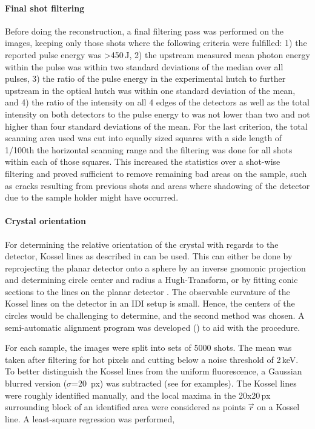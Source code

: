\paragraph{Final shot filtering}
Before doing the reconstruction, a final filtering pass was performed on the images, keeping only those shots where the following criteria were fulfilled: 1)  the reported pulse energy was >450\,\textmu J, 2) the upstream measured mean photon energy within the pulse was within two standard deviations of the median over all pulses, 3) the ratio of the pulse energy in the experimental hutch to further upstream in the optical hutch was within one standard deviation of the mean, and 4) the ratio of the intensity on all 4 edges of the detectors as well as the total intensity on both detectors to the pulse energy to was not lower than two and not higher than four standard deviations of the mean.  For the last criterion, the total scanning area used was cut into equally sized squares with a side length of 1/100th the horizontal scanning range and the filtering was done for all shots within each of those squares. This increased the statistics over a shot-wise filtering and proved sufficient to remove remaining bad areas on the sample, such as cracks resulting from previous shots and areas where shadowing of the detector due to the sample holder might have occurred.





\paragraph{Crystal orientation}
For determining the relative orientation of the crystal with regards to the detector, Kossel lines as described in  can be used. This can either be done by reprojecting the planar detector onto a sphere by an inverse gnomonic projection and determining circle center and radius a Hugh-Transform, or by fitting conic sections to the lines on the planar detector \cite{morris1968,morawiec2016,faigel2016,herron2018}. The observable curvature of the Kossel lines on the detector in an IDI setup is small. Hence, the centers of the circles would be challenging to determine, and the second method was chosen. A semi-automatic alignment program was developed () to aid with the procedure.

For each sample, the images were split into sets of 5000 shots. The mean was taken after filtering for hot pixels and cutting below a noise threshold of 2\,keV. To better distinguish the Kossel lines from the uniform fluorescence, a Gaussian blurred version ($\sigma$=20\, px) was subtracted (see  for examples). The Kossel lines were roughly identified manually, and the local maxima in the 20x20\,px surrounding block of an identified area were considered as points $\vec{r}$ on a Kossel line. A least-square regression was performed,

